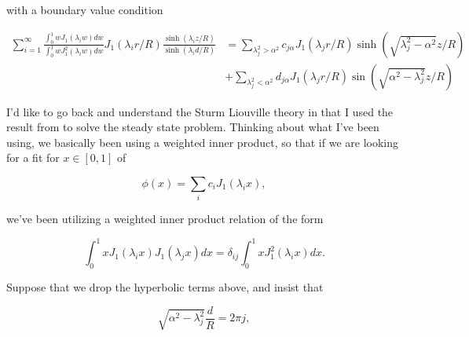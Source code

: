 with a boundary value condition

%
\begin{equation}\label{eqn:coffeeCupWithBottom:720f}
\begin{aligned}
\sum_{i=1}^\infty 
\frac{
\int_0^1 w J_1 (\lambda_i w) dw
}{
\int_0^1 w J_1^2 (\lambda_i w) dw
}
J_1(\lambda_i r/R) \frac{\sinh(\lambda_i z/R)}{\sinh(\lambda_i d/R) } 
&=
\sum_{\lambda_j^2 > \alpha^2} c_{j \alpha} J_1(\lambda_j r/R) \sinh\left( \sqrt{\lambda_j^2 - \alpha^2} z/R \right) \\
&+\sum_{\lambda_j^2 < \alpha^2} d_{j \alpha} J_1(\lambda_j r/R) \sin\left( \sqrt{\alpha^2 -\lambda_j^2 } z/R \right)
\end{aligned}
\end{equation}

I'd like to go back and understand the Sturm Liouville theory in \citep{sagan1989boundary} that I used the result from to solve the steady state problem.  Thinking about what I've been using, we basically been using a weighted inner product, so that if we are looking for a fit for $x \in [0,1]$ of

\begin{equation}\label{eqn:coffeeCupWithBottom:820}
\phi(x) = \sum_i c_i J_1(\lambda_i x),
\end{equation}

we've been utilizing a weighted inner product relation of the form

\begin{equation}\label{eqn:coffeeCupWithBottom:840}
\int_0^1 x J_1(\lambda_i x) J_1(\lambda_j x) dx = \delta_{ij} \int_0^1 x J_1^2(\lambda_i x) dx.
\end{equation}

Suppose that we drop the hyperbolic terms above, and insist that

\begin{equation}\label{eqn:coffeeCupWithBottom:860}
\sqrt{\alpha^2 - \lambda_j^2} \frac{d}{R} = 2 \pi j,
\end{equation}


